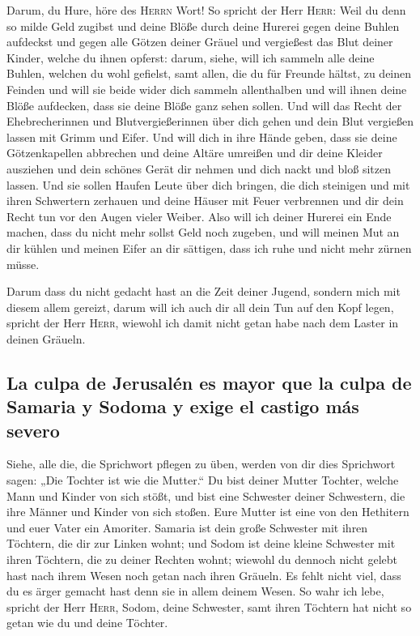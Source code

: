  Darum, du Hure, höre des \textsc{Herrn} Wort!
 So spricht der Herr \textsc{Herr}: Weil du denn so milde
Geld zugibst und deine Blöße durch deine Hurerei gegen deine Buhlen
aufdeckst und gegen alle Götzen deiner Gräuel und vergießest das Blut
deiner Kinder, welche du ihnen opferst:  darum, siehe,
will ich sammeln alle deine Buhlen, welchen du wohl gefielst, samt
allen, die du für Freunde hältst, zu deinen Feinden und will sie beide
wider dich sammeln allenthalben und will ihnen deine Blöße aufdecken,
dass sie deine Blöße ganz sehen sollen.  Und will das
Recht der Ehebrecherinnen und Blutvergießerinnen über dich gehen und
dein Blut vergießen lassen mit Grimm und Eifer.  Und will
dich in ihre Hände geben, dass sie deine Götzenkapellen abbrechen und
deine Altäre umreißen und dir deine Kleider ausziehen und dein schönes
Gerät dir nehmen und dich nackt und bloß sitzen lassen. 
Und sie sollen Haufen Leute über dich bringen, die dich steinigen und
mit ihren Schwertern zerhauen  und deine Häuser mit Feuer
verbrennen und dir dein Recht tun vor den Augen vieler Weiber. Also will
ich deiner Hurerei ein Ende machen, dass du nicht mehr sollst Geld noch
zugeben,  und will meinen Mut an dir kühlen und meinen
Eifer an dir sättigen, dass ich ruhe und nicht mehr zürnen müsse.

 Darum dass du nicht gedacht hast an die Zeit deiner
Jugend, sondern mich mit diesem allem gereizt, darum will ich auch dir
all dein Tun auf den Kopf legen, spricht der Herr \textsc{Herr}, wiewohl
ich damit nicht getan habe nach dem Laster in deinen Gräueln.

\hypertarget{la-culpa-de-jerusaluxe9n-es-mayor-que-la-culpa-de-samaria-y-sodoma-y-exige-el-castigo-muxe1s-severo}{%
\subsection{La culpa de Jerusalén es mayor que la culpa de Samaria y
Sodoma y exige el castigo más
severo}\label{la-culpa-de-jerusaluxe9n-es-mayor-que-la-culpa-de-samaria-y-sodoma-y-exige-el-castigo-muxe1s-severo}}

 Siehe, alle die, die Sprichwort pflegen zu üben, werden
von dir dies Sprichwort sagen: „Die Tochter ist wie die Mutter.``
 Du bist deiner Mutter Tochter, welche Mann und Kinder
von sich stößt, und bist eine Schwester deiner Schwestern, die ihre
Männer und Kinder von sich stoßen. Eure Mutter ist eine von den
Hethitern und euer Vater ein Amoriter.  Samaria ist dein
große Schwester mit ihren Töchtern, die dir zur Linken wohnt; und Sodom
ist deine kleine Schwester mit ihren Töchtern, die zu deiner Rechten
wohnt;  wiewohl du dennoch nicht gelebt hast nach ihrem
Wesen noch getan nach ihren Gräueln. Es fehlt nicht viel, dass du es
ärger gemacht hast denn sie in allem deinem Wesen.  So
wahr ich lebe, spricht der Herr \textsc{Herr}, Sodom, deine Schwester,
samt ihren Töchtern hat nicht so getan wie du und deine Töchter.

